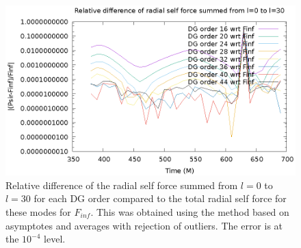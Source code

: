 \begin{figure}
\includegraphics{reldiffpsirvtwfinfdgorders}
\caption{Relative difference of the radial self force summed from $l=0$ to $l=30$  for each DG order compared to the total radial self force for these modes for $F_{inf}$. This was obtained using the method based on asymptotes and averages with rejection of outliers. The error is at the $10^{-4}$ level.}
\label{relmixed}
\end{figure}
